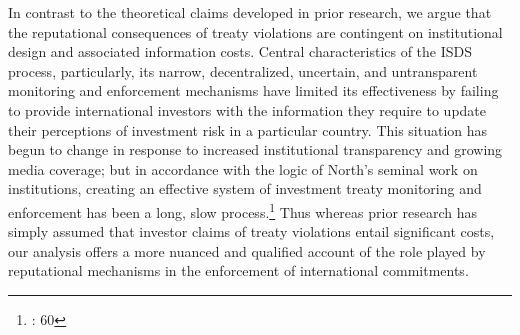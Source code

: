 \documentclass[12pt,onesided]{amsart}
\begin{document}
In contrast to the theoretical claims developed in prior research, we argue that the reputational consequences of treaty violations are contingent on institutional design and associated information costs. Central characteristics of the ISDS process, particularly, its narrow, decentralized, uncertain, and untransparent monitoring and enforcement mechanisms have limited its effectiveness by failing to provide international investors with the information they require to update their perceptions of investment risk in a particular country. This situation has begun to change in response to increased institutional transparency and growing media coverage; but in accordance with the logic of North's seminal work on institutions, creating an effective system of investment treaty monitoring and enforcement has been a long, slow process.\footnote{\citet{north1990institutions}: 60} Thus whereas prior research has simply assumed that investor claims of treaty violations entail significant costs, our analysis offers a more nuanced and qualified account of the role played by reputational mechanisms in the enforcement of international commitments.


\end{document}
